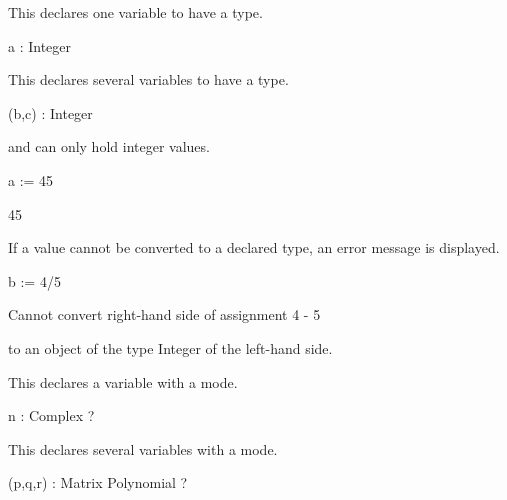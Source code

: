 \begin{xtc}
\begin{xtccomment}
This declares one variable to have a type.
\end{xtccomment}
\begin{spadsrc}
a : Integer 
\end{spadsrc}
\end{xtc}
\begin{xtc}
\begin{xtccomment}
This declares several variables to have a type.
\end{xtccomment}
\begin{spadsrc}
(b,c) : Integer 
\end{spadsrc}
\end{xtc}
\begin{xtc}
\begin{xtccomment}
 and  can only hold integer values.
\end{xtccomment}
\begin{spadsrc}
a := 45 
\end{spadsrc}
\begin{TeXOutput}
\begin{fricasmath}{3}
45%
\end{fricasmath}
\end{TeXOutput}
\end{xtc}
\begin{xtc}
\begin{xtccomment}
If a value cannot be converted to a declared type,
an error message is displayed.
\end{xtccomment}
\begin{spadsrc}
b := 4/5 
\end{spadsrc}
\begin{MessageOutput}
   Cannot convert right-hand side of assignment
   4
   -
   5

      to an object of the type Integer of the left-hand side.
\end{MessageOutput}
\end{xtc}
\begin{xtc}
\begin{xtccomment}
This declares a variable with a mode.
\end{xtccomment}
\begin{spadsrc}
n : Complex ? 
\end{spadsrc}
\end{xtc}
\begin{xtc}
\begin{xtccomment}
This declares several variables with a mode.
\end{xtccomment}
\begin{spadsrc}
(p,q,r) : Matrix Polynomial ? 
\end{spadsrc}
\end{xtc}
